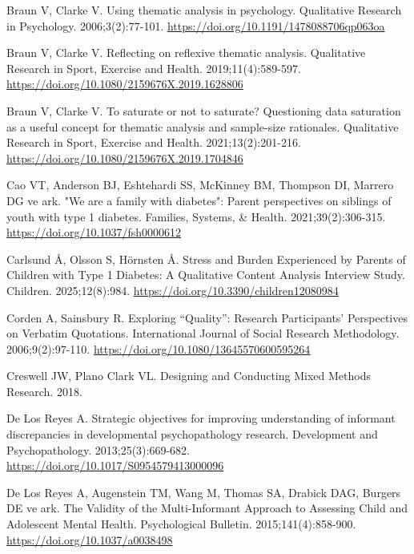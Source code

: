 \documentclass[
  turkish,
  a4paper,
  DIV=11,
  numbers=noendperiod]{scrreprt}
\newlength{\cslhangindent}
\newenvironment{CSLReferences}[2] %
 {\begin{list}{}{%
  \setlength{\itemindent}{0pt}
  \setlength{\leftmargin}{0pt}
  \setlength{\parsep}{0pt}
  \ifodd #1
   \setlength{\leftmargin}{\cslhangindent}
   \setlength{\itemindent}{-1\cslhangindent}
  \fi
  \setlength{\itemsep}{#2\baselineskip}}}
 {\end{list}}
\begin{document}
\begin{CSLReferences}{1}{0}
Braun V, Clarke V. Using thematic analysis in psychology. Qualitative
Research in Psychology. 2006;3(2):77-101.
\url{https://doi.org/10.1191/1478088706qp063oa}

Braun V, Clarke V. Reflecting on reflexive thematic analysis.
Qualitative Research in Sport, Exercise and Health. 2019;11(4):589-597.
\url{https://doi.org/10.1080/2159676X.2019.1628806}

Braun V, Clarke V. To saturate or not to saturate? Questioning data
saturation as a useful concept for thematic analysis and sample-size
rationales. Qualitative Research in Sport, Exercise and Health.
2021;13(2):201-216. \url{https://doi.org/10.1080/2159676X.2019.1704846}

Cao VT, Anderson BJ, Eshtehardi SS, McKinney BM, Thompson DI, Marrero DG
ve ark. "We are a family with diabetes": Parent perspectives on siblings
of youth with type 1 diabetes. Families, Systems, \& Health.
2021;39(2):306-315. \url{https://doi.org/10.1037/fsh0000612}

Carlsund Å, Olsson S, Hörnsten Å. Stress and Burden Experienced by
Parents of Children with Type 1 Diabetes: A Qualitative Content Analysis
Interview Study. Children. 2025;12(8):984.
\url{https://doi.org/10.3390/children12080984}

Corden A, Sainsbury R. Exploring {``Quality''}: Research Participants'
Perspectives on Verbatim Quotations. International Journal of Social
Research Methodology. 2006;9(2):97-110.
\url{https://doi.org/10.1080/13645570600595264}

Creswell JW, Plano Clark VL. Designing and Conducting Mixed Methods
Research. 2018.

De Los Reyes A. Strategic objectives for improving understanding of
informant discrepancies in developmental psychopathology research.
Development and Psychopathology. 2013;25(3):669-682.
\url{https://doi.org/10.1017/S0954579413000096}

De Los Reyes A, Augenstein TM, Wang M, Thomas SA, Drabick DAG, Burgers
DE ve ark. The Validity of the Multi-Informant Approach to Assessing
Child and Adolescent Mental Health. Psychological Bulletin.
2015;141(4):858-900. \url{https://doi.org/10.1037/a0038498}


\end{CSLReferences}
\end{document}
